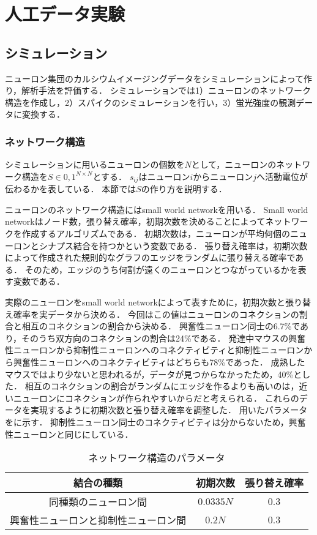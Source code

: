 \chapter{人工データ実験}
\section{シミュレーション}
ニューロン集団のカルシウムイメージングデータをシミュレーションによって作り，解析手法を評価する．
シミュレーションでは1）ニューロンのネットワーク構造を作成し，2）スパイクのシミュレーションを行い，3）蛍光強度の観測データに変換する．
\subsection{ネットワーク構造}
シミュレーションに用いるニューロンの個数を$N$として，ニューロンのネットワーク構造を$S \in {0, 1}^{N \times N}$とする．
$s_{ij}$はニューロン$i$からニューロン$j$へ活動電位が伝わるかを表している．
本節では$S$の作り方を説明する．

ニューロンのネットワーク構造にはsmall world network\cite{Watts1998}を用いる．
Small world networkはノード数，張り替え確率，初期次数を決めることによってネットワークを作成するアルゴリズムである．
初期次数は，ニューロンが平均何個のニューロンとシナプス結合を持つかという変数である．
張り替え確率は，初期次数によって作成された規則的なグラフのエッジをランダムに張り替える確率である．
そのため，エッジのうち何割が遠くのニューロンとつながっているかを表す変数である．

実際のニューロンをsmall world networkによって表すために，初期次数と張り替え確率を実データから決める．
今回はこの値はニューロンのコネクションの割合と相互のコネクションの割合から決める．
興奮性ニューロン同士の6.7\%であり，そのうち双方向のコネクションの割合は24\%である\cite{Jouhanneau2015}．
発達中マウスの興奮性ニューロンから抑制性ニューロンへのコネクティビティと抑制性ニューロンから興奮性ニューロンへのコネクティビティはどちらも78\%であった\cite{Holmgren2003}．
成熟したマウスではより少ないと思われるが，データが見つからなかったため，40\%とした．
相互のコネクションの割合がランダムにエッジを作るよりも高いのは，近いニューロンにコネクションが作られやすいからだと考えられる．
これらのデータを実現するように初期次数と張り替え確率を調整した．
用いたパラメータをに示す．
抑制性ニューロン同士のコネクティビティは分からないため，興奮性ニューロンと同じにしている．

\begin{table}[htb]
  \center
  \begin{tabular}{|c|cc|} \hline
    結合の種類 & 初期次数 & 張り替え確率 \\ \hline
		同種類のニューロン間 & $0.0335 N$ & $0.3$ \\
		興奮性ニューロンと抑制性ニューロン間 & $0.2N$ & $0.3$\\ \hline
  \end{tabular}
  \caption{ネットワーク構造のパラメータ}
  \label{tab:parameter1}
\end{table}


